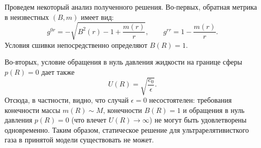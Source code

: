 \documentclass[\docroot/reports/draft/report.tex]{subfiles}
\begin{document}
    Проведем некоторый анализ полученного решения. Во-первых, обратная метрика в неизвестных $(B,m)$ имеет вид:
    \begin{equation*}
        g^{0r} = - \sqrt{B^2(r) - 1 + \frac{m(r)}{r}} , \qquad
        g^{rr} = 1 - \frac{m(r)}{r} .
    \end{equation*}
    Условия сшивки непосредственно определяют $B(R) = 1$.

    Во-вторых, условие обращения в нуль давления жидкости на границе сферы $p(R) = 0$ дает также
    \begin{equation*}
        U(R) = \sqrt{\frac{c_0}{\epsilon}} .
    \end{equation*}
    Отсюда, в частности, видно, что случай $\epsilon = 0$ несостоятелен: требования конечности массы $m(R) \sim M$, конечности $B(R) = 1$ и обращения в нуль давления $p(R) = 0$ (что влечет $U(R) \to \infty$) не могут быть удовлетворены одновременно. Таким образом, статическое решение для ультрарелятивисткого газа в принятой модели существовать не может.

\end{document}
